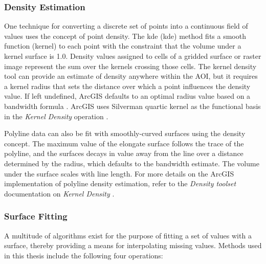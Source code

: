 \subsubsection{Density Estimation}\label{ch3:density_est}
One technique for converting a discrete set of points into a continuous field of values uses the concept of point density. The \acrlong{kde} (\acrshort{kde}) method fits a smooth function (kernel) to each point with the constraint that the volume under a kernel surface is 1.0. Density values assigned to cells of a gridded surface or raster image represent the sum over the kernels crossing those cells. The kernel density tool can provide an estimate of density anywhere within the AOI, but it requires a kernel radius that sets the distance over which a point influences the density value. If left undefined, ArcGIS defaults to an optimal radius value based on a bandwidth formula \citep{esri_kernel_2021}. ArcGIS uses Silverman quartic kernel as the functional basis in the \textit{Kernel Density} operation \citep{esri_kernel_2021,silverman_density_1986}.

Polyline data can also be fit with smoothly-curved surfaces using the density concept. The maximum value of the elongate surface follows the trace of the polyline, and the surfaces decays in value away from the line over a distance determined by the radius, which defaults to the bandwidth estimate. The volume under the surface scales with line length. For more details on the ArcGIS implementation of polyline density estimation, refer to the \textit{Density toolset} documentation on \textit{Kernel Density} \citep{esri_kernel_2021}.

\subsubsection{Surface Fitting}\label{ch3:surface_fit}
A multitude of algorithms exist for the purpose of fitting a set of values with a surface, thereby providing a means for interpolating missing values. Methods used in this thesis include the following four operations:

